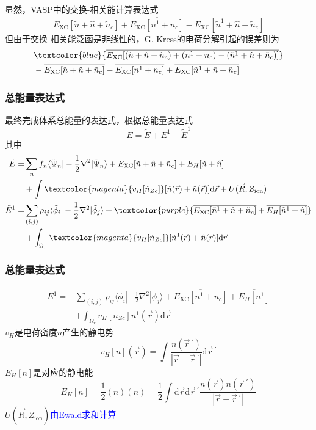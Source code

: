 {{显然，\textrm{VASP}中的交换-相关能计算表达式
\begin{displaymath}
	E_{\mathrm{XC}}[\tilde n+\hat n+\tilde n_c]+\overline{E_{\mathrm{XC}}[n^1+n_c]}-\overline{E_{\mathrm{XC}}[\tilde n^1+\hat n+\tilde n_c]}
\end{displaymath}
但由于交换-相关能泛函是非线性的，\textrm{G. Kress}的电荷分解引起的误差则为
\begin{displaymath}
	\begin{aligned}
		&\textcolor{blue}{\overline{E_{\mathrm{XC}}[(\tilde n+\hat n+\tilde n_c)+(n^1+n_c)-(\tilde n^1+\hat n+\tilde n_c)]}}\\
		&-\overline{E_{\mathrm{XC}}[\tilde n+\hat n+\tilde n_c]}-\overline{E_{\mathrm{XC}}[n^1+n_c]}+\overline{E_{\mathrm{XC}}[\tilde n^1+\hat n+\tilde n_c]}
	\end{aligned}
\end{displaymath}
}

\frame
{
	\frametitle{总能量表达式}
	最终完成体系总能量的表达式，根据总能量表达式$$E=\tilde E+E^1-\tilde E^1$$其中
	\begin{displaymath}
		\begin{aligned}
			\tilde E=&\sum_nf_n\langle\tilde\Psi_n|-\frac12\nabla^2|\tilde\Psi_n\rangle+E_{\mathrm{XC}}[\tilde n+\hat n+\tilde n_c]+E_H[\tilde n+\hat n]\\
			&+\int \textcolor{magenta}{v_H[\tilde n_{Zc}]}[\tilde n(\vec r)+\hat n(\vec r)]\mathrm{d}\vec r+U(\vec R,Z_{\mathrm{ion}})\\
			\tilde E^1=&\sum_{(i,j)}\rho_{ij}\langle\tilde\phi_i|-\frac12\nabla^2|\tilde\phi_j\rangle+\textcolor{purple}{\overline{E_{\mathrm{XC}}[\tilde n^1+\hat n+\tilde n_c]}+\overline{E_H[\tilde n^1+\hat n]}}\\
			&+\int_{\Omega_r}\textcolor{magenta}{v_H[\tilde n_{Zc}]}[\tilde n^1(\vec r)+\hat n(\vec r)]\mathrm{d}\vec r
		\end{aligned}
	\end{displaymath}
}

\frame
{
	\frametitle{总能量表达式}
	\begin{displaymath}
		\begin{aligned}
			E^1=&\sum_{(i,j)}\rho_{ij}\langle\phi_i|-\frac12\nabla^2|\phi_j\rangle+\overline{E_{\mathrm{XC}}[n^1+n_c]}+\overline{E_H[n^1]}\\
			&+\int_{\Omega_r}v_H[n_{Zc}]n^1(\vec r)\mathrm{d}\vec r
		\end{aligned}
	\end{displaymath}
	$v_H$是电荷密度$n$产生的静电势
	$$v_H[n](\vec r)=\int\dfrac{n(\vec r\,^{\prime})}{|\vec r-\vec r\,^{\prime}|}\mathrm{d}\vec r\,^{\prime}$$
	$E_H[n]$是对应的静电能
	$$E_H[n]=\dfrac12(n)(n)=\dfrac12\int\mathrm{d}\vec r\mathrm{d}\vec r\,^{\prime}\dfrac{n(\vec r)n(\vec r\,^{\prime})}{|\vec r-\vec r\,^{\prime}|}$$ 
	$U(\vec R,Z_{\mathrm{ion}})$\textcolor{blue}{由\textrm{Ewald}求和计算}
}

}
